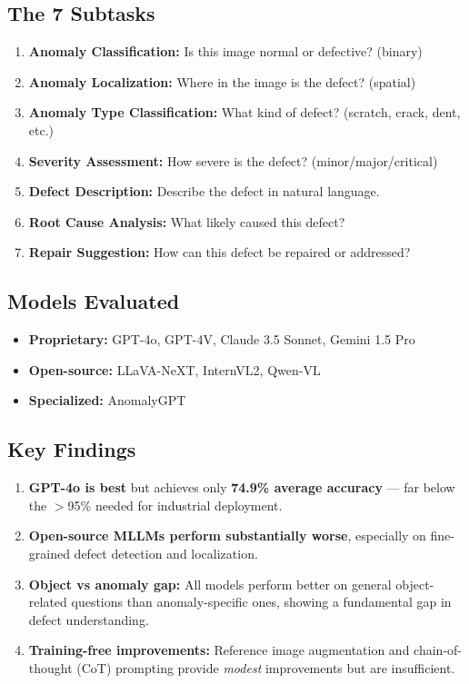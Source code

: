 \documentclass[12pt, a4paper]{article}
\begin{document}
\subsection{The 7 Subtasks}
\begin{enumerate}[leftmargin=*]
    \item \textbf{Anomaly Classification:} Is this image normal or defective? (binary)
    \item \textbf{Anomaly Localization:} Where in the image is the defect? (spatial)
    \item \textbf{Anomaly Type Classification:} What kind of defect? (scratch, crack, dent, etc.)
    \item \textbf{Severity Assessment:} How severe is the defect? (minor/major/critical)
    \item \textbf{Defect Description:} Describe the defect in natural language.
    \item \textbf{Root Cause Analysis:} What likely caused this defect?
    \item \textbf{Repair Suggestion:} How can this defect be repaired or addressed?
\end{enumerate}

\subsection{Models Evaluated}
\begin{itemize}[leftmargin=*]
    \item \textbf{Proprietary:} GPT-4o, GPT-4V, Claude 3.5 Sonnet, Gemini 1.5 Pro
    \item \textbf{Open-source:} LLaVA-NeXT, InternVL2, Qwen-VL
    \item \textbf{Specialized:} AnomalyGPT
\end{itemize}

\subsection{Key Findings}
\begin{enumerate}[leftmargin=*]
    \item \textbf{GPT-4o is best} but achieves only \textbf{74.9\% average accuracy} --- far below the $>$95\% needed for industrial deployment.
    \item \textbf{Open-source MLLMs perform substantially worse}, especially on fine-grained defect detection and localization.
    \item \textbf{Object vs anomaly gap:} All models perform better on general object-related questions than anomaly-specific ones, showing a fundamental gap in defect understanding.
    \item \textbf{Training-free improvements:} Reference image augmentation and chain-of-thought (CoT) prompting provide \textit{modest} improvements but are insufficient.
\end{enumerate}
\end{document}
